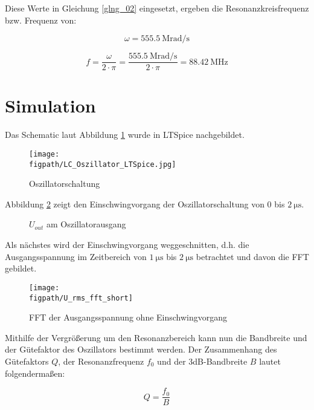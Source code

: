 Diese Werte in Gleichung \ref{glng_02} eingesetzt, ergeben die Resonanzkreisfrequenz bzw. Frequenz von:

\begin{equation}
    \omega = \SI{555.5}{\mega \radian \per \second}
\end{equation}

\begin{equation}
    f = \frac{\omega}{2 \cdot \pi} = \frac{\SI{555.5}{\mega \radian \per \second}}{2 \cdot \pi} = \SI{88.42}{\mega \hertz}
\end{equation}


\section{Simulation}
Das Schematic laut Abbildung \ref{fig_Kap2_05:LTSpiceSchematic} wurde in LTSpice nachgebildet.

\begin{figure}[H]
    \centering
    \texttt{[image: \\figpath/LC\_Oszillator\_LTSpice.jpg]}
    \caption{Oszillatorschaltung}
    \label{fig_Kap2_05:LTSpiceSchematic}
\end{figure}

Abbildung \ref{fig_Kap2_06:Einschw} zeigt den Einschwingvorgang der Oszillatorschaltung von 0 bis $\SI{2}{\micro\second}$. 

\begin{figure}[H]
	\centering \small
	
	\caption{$U_{out}$ am Oszillatorausgang}
	\label{fig_Kap2_06:Einschw}
\end{figure}

Als nächstes wird der Einschwingvorgang weggeschnitten, d.h. die Ausgangsspannung im Zeitbereich von $\SI{1}{\micro\second}$ bis $\SI{2}{\micro\second}$ betrachtet und davon die FFT gebildet.

\begin{figure}[H]
	\centering \small
	\texttt{[image: \\figpath/U\_rms\_fft\_short]}
	\caption{FFT der Ausgangsspannung ohne Einschwingvorgang}
	\label{fig_Kap2_07:FFT_ohne}
\end{figure}

Mithilfe der Vergrößerung um den Resonanzbereich kann nun die Bandbreite und der Gütefaktor des Oszillators bestimmt werden. Der Zusammenhang des Gütefaktors $Q$, der Resonanzfrequenz $f_0$ und der 3dB-Bandbreite $B$ lautet folgendermaßen:

\begin{equation}
    Q = \frac{f_0}{B}
\end{equation}

